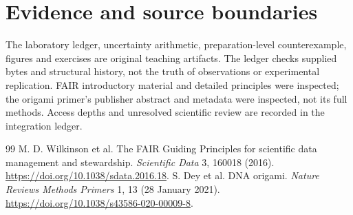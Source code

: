 \chapter*{Evidence and source boundaries}
The laboratory ledger, uncertainty arithmetic, preparation-level counterexample,
figures and exercises are original teaching artifacts. The ledger checks supplied
bytes and structural history, not the truth of observations or experimental replication.
FAIR introductory material and detailed principles were inspected; the origami
primer's publisher abstract and metadata were inspected, not its full methods.
Access depths and unresolved scientific review are recorded in the integration ledger.
\begin{thebibliography}{99}
 M. D. Wilkinson et al.
The FAIR Guiding Principles for scientific data management and stewardship.
\emph{Scientific Data} 3, 160018 (2016).
\url{https://doi.org/10.1038/sdata.2016.18}.
 S. Dey et al. DNA origami.
\emph{Nature Reviews Methods Primers} 1, 13 (28 January 2021).
\url{https://doi.org/10.1038/s43586-020-00009-8}.
\end{thebibliography}
